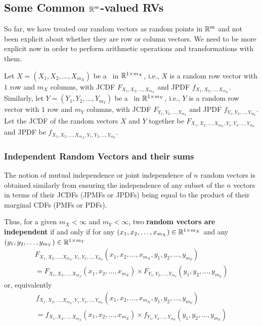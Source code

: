 \subsection{Some Common $\mathbb{R}^m$-valued RVs}\label{S:SomeCommonRmValuedRVs} 


So far, we have treated our random vectors as random points in $\mathbb{R}^m$ and not been explicit about whether they are row or column vectors.  
We need to be more explicit now in order to perform arithmetic operations and transformations with them.

Let $X=(X_1,X_2,\ldots,X_{m_X})$ be a \rv~in $\mathbb{R}^{1 \times m_X}$, i.e., $X$ is a random row vector with $1$ row and $m_X$ columns, with JCDF $F_{X_1,X_2,\ldots,X_{m_X}}$ and JPDF $f_{X_1,X_2,\ldots,X_{m_X}}$.  
Similarly, let $Y=(Y_1,Y_2,\ldots,Y_{m_Y})$ be a \rv~in $\mathbb{R}^{1 \times m_Y}$, i.e., $Y$ is a random row vector with $1$ row and $m_Y$ columns, with JCDF $F_{Y_1,Y_2,\ldots,Y_{m_Y}}$ and JPDF $f_{Y_1,Y_2,\ldots,Y_{m_Y}}$.
Let the JCDF of the random vectors $X$ and $Y$ together be $F_{X_1,X_2,\ldots,X_{m_X},Y_1,Y_2,\ldots,Y_{m_Y}}$ and JPDF be $f_{X_1,X_2,\ldots,X_{m_X},Y_1,Y_2,\ldots,Y_{m_Y}}$.  

\subsubsection{Independent Random Vectors and their sums}
The notion of mutual independence or joint independence of $n$ random vectors is obtained similarly from ensuring the independence of any subset of the $n$ vectors in terms of their JCDFs (JPMFs or JPDFs) being equal to the product of their marginal CDFs (PMFs or PDFs). 

Thus, for a given $m_X <\infty$ and $m_Y < \infty$, two {\bf random vectors are independent} if and only if for any $(x_1,x_2,\ldots,x_{m_X}) \in \mathbb{R}^{1 \times m_X}$ and any $(y_1,y_2,\ldots,y_{m_Y}) \in \mathbb{R}^{1 \times m_Y}$
\begin{multline*}
F_{X_1,X_2,\ldots,X_{m_X},Y_1,Y_2,\ldots,Y_{m_Y}}(x_1,x_2,\ldots,x_{m_X},y_1,y_2,\ldots,y_{m_Y})\\
= F_{X_1,X_2,\ldots,X_{m_X}}(x_1,x_2,\ldots,x_{m_X}) \times F_{Y_1,Y_2,\ldots,Y_{m_Y}}(y_1,y_2,\ldots,y_{m_Y})
\end{multline*}
or, equivalently
\begin{multline*}
f_{X_1,X_2,\ldots,X_{m_X},Y_1,Y_2,\ldots,Y_{m_Y}}(x_1,x_2,\ldots,x_{m_X},y_1,y_2,\ldots,y_{m_Y})\\
= f_{X_1,X_2,\ldots,X_{m_X}}(x_1,x_2,\ldots,x_{m_X}) \times f_{Y_1,Y_2,\ldots,Y_{m_Y}}(y_1,y_2,\ldots,y_{m_Y})
\end{multline*}

